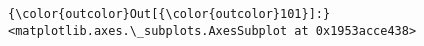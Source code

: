 \documentclass[11pt]{article}
\begin{document}
\begin{Verbatim}[commandchars=\\\{\}]
{\color{outcolor}Out[{\color{outcolor}101}]:} <matplotlib.axes.\_subplots.AxesSubplot at 0x1953acce438>
\end{Verbatim}
            
    \begin{center}
    \end{center}
    { \hspace*{\fill} \\}
    

    
    
    
    
\end{document}
